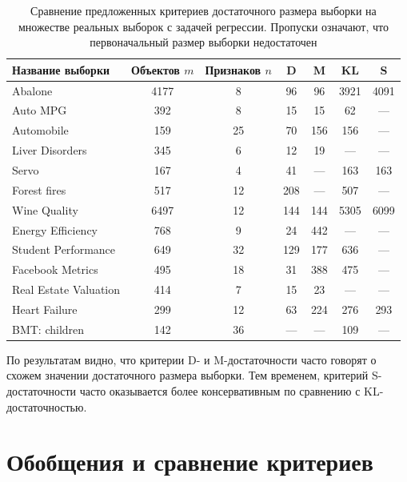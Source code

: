 \begin{table}[htbp]
    \centering
    \caption{Сравнение предложенных критериев достаточного размера выборки на множестве реальных выборок с задачей регрессии. Пропуски означают, что первоначальный размер выборки недостаточен}
    \label{tab:linear-comparison}
    \begin{SingleSpace}
        \begin{tabular}{@{}lcccccc@{}} 
            \toprule
            Название выборки & Объектов $m$ & Признаков $n$ & D & M & KL & S \\
            \midrule
            Abalone & 4177 & 8 & 96 & 96 & 3921 & 4091 \\
            Auto MPG & 392 & 8 & 15 & 15 & 62 & --- \\
            Automobile & 159 & 25 & 70 & 156 & 156 & --- \\
            Liver Disorders & 345 & 6 & 12 & 19 & --- & --- \\
            Servo & 167 & 4 & 41 & --- & 163 & 163 \\
            Forest fires & 517 & 12 & 208 & --- & 507 & --- \\
            Wine Quality & 6497 & 12 & 144 & 144 & 5305 & 6099 \\
            Energy Efficiency & 768 & 9 & 24 & 442 & --- & --- \\
            Student Performance & 649 & 32 & 129 & 177 & 636 & --- \\
            Facebook Metrics & 495 & 18 & 31 & 388 & 475 & ---  \\
            Real Estate Valuation & 414 & 7 & 15 & 23 & --- & --- \\
            Heart Failure & 299 & 12 & 63 & 224 & 276 & 293 \\
            BMT: children & 142 & 36 & --- & --- & 109 & --- \\
            \bottomrule
        \end{tabular}
    \end{SingleSpace}
\end{table}

По результатам видно, что критерии D- и M-достаточности часто говорят о схожем значении достаточного размера выборки. Тем временем, критерий S-достаточности часто оказывается более консервативным по сравнению с KL-достаточностью.

\clearpage
\section{Обобщения и сравнение критериев}

